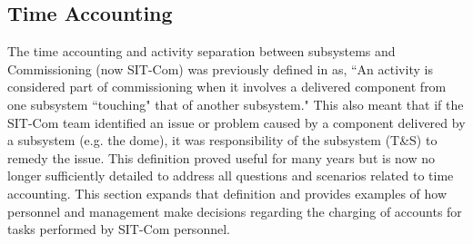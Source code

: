 \documentclass[SE,lsstdraft,authoryear,toc]{lsstdoc}
\begin{document}
%
%


\subsection{Time Accounting}
\label{sec:time}

The time accounting and activity separation between subsystems and Commissioning (now SIT-Com) was previously defined in  as, ``An activity is considered part of commissioning when it involves a delivered component from one subsystem ``touching" that of another subsystem."
This also meant that if the SIT-Com team identified an issue or problem caused by a component delivered by a subsystem (e.g. the dome), it was responsibility of the subsystem (T\&S) to remedy the issue.
This definition proved useful for many years but is now no longer sufficiently detailed to address all questions and scenarios related to time accounting.
This section expands that definition and provides examples of how personnel and management make decisions regarding the charging of accounts for tasks performed by SIT-Com personnel.
\end{document}
